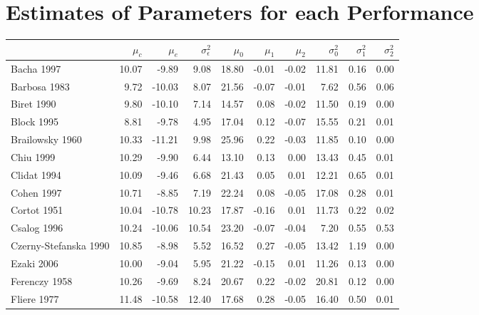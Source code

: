 \documentclass[12pt]{article}
\begin{document}
\newpage

\appendix
\appendixpage
\addappheadtotoc

\section{Estimates of Parameters for each Performance}
\label{appendixa}

\begin{table}[H]
\centering
\begin{tabular}{lrrrrrrrrr}
\toprule
  & $\mu_c$ & $\mu_e$ & $\sigma^2_\epsilon$ & $\mu_0$ & $\mu_1$ & $\mu_2$ & $\sigma^2_0$ & $\sigma^2_1$ & $\sigma^2_2$\\
\midrule
\rowcolor{gray!6}  Bacha 1997 & 10.07 & -9.89 & 9.08 & 18.80 & -0.01 & -0.02 & 11.81 & 0.16 & 0.00\\
Barbosa 1983 & 9.72 & -10.03 & 8.07 & 21.56 & -0.07 & -0.01 & 7.62 & 0.56 & 0.06\\
\rowcolor{gray!6}  Biret 1990 & 9.80 & -10.10 & 7.14 & 14.57 & 0.08 & -0.02 & 11.50 & 0.19 & 0.00\\
Block 1995 & 8.81 & -9.78 & 4.95 & 17.04 & 0.12 & -0.07 & 15.55 & 0.21 & 0.01\\
\rowcolor{gray!6}  Brailowsky 1960 & 10.33 & -11.21 & 9.98 & 25.96 & 0.22 & -0.03 & 11.85 & 0.10 & 0.00\\
\addlinespace
Chiu 1999 & 10.29 & -9.90 & 6.44 & 13.10 & 0.13 & 0.00 & 13.43 & 0.45 & 0.01\\
\rowcolor{gray!6}  Clidat 1994 & 10.09 & -9.46 & 6.68 & 21.43 & 0.05 & 0.01 & 12.21 & 0.65 & 0.01\\
Cohen 1997 & 10.71 & -8.85 & 7.19 & 22.24 & 0.08 & -0.05 & 17.08 & 0.28 & 0.01\\
\rowcolor{gray!6}  Cortot 1951 & 10.04 & -10.78 & 10.23 & 17.87 & -0.16 & 0.01 & 11.73 & 0.22 & 0.02\\
Csalog 1996 & 10.24 & -10.06 & 10.54 & 23.20 & -0.07 & -0.04 & 7.20 & 0.55 & 0.53\\
\addlinespace
\rowcolor{gray!6}  Czerny-Stefanska 1990 & 10.85 & -8.98 & 5.52 & 16.52 & 0.27 & -0.05 & 13.42 & 1.19 & 0.00\\
Ezaki 2006 & 10.00 & -9.04 & 5.95 & 21.22 & -0.15 & 0.01 & 11.26 & 0.13 & 0.00\\
\rowcolor{gray!6}  Ferenczy 1958 & 10.26 & -9.69 & 8.24 & 20.67 & 0.22 & -0.02 & 20.81 & 0.12 & 0.00\\
Fliere 1977 & 11.48 & -10.58 & 12.40 & 17.68 & 0.28 & -0.05 & 16.40 & 0.50 & 0.01\\

\end{tabular}
\end{table}
\end{document}
